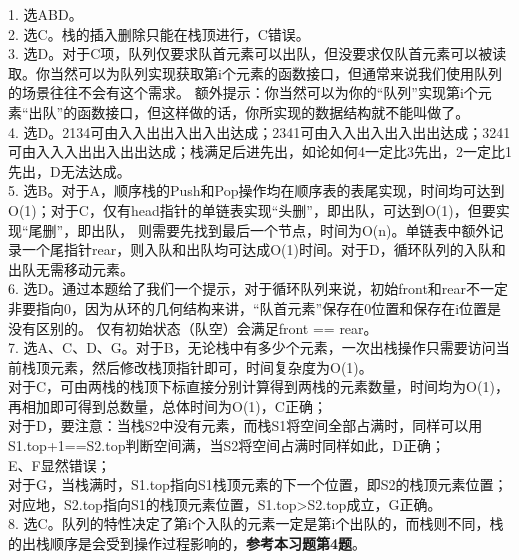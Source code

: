 \begin{exerciseanswer}
    1. 选ABD。\\

    2. 选C。栈的插入删除只能在栈顶进行，C错误。\\

    3. 选D。对于C项，队列仅要求队首元素可以出队，但没要求仅队首元素可以被读取。你当然可以为队列实现获取第i个元素的函数接口，但通常来说我们使用队列的场景往往不会有这个需求。
    额外提示：你当然可以为你的“队列”实现第i个元素“出队”的函数接口，但这样做的话，你所实现的数据结构就不能叫做了。\\

    4. 选D。2134可由入入出出入出入出达成；2341可由入入出入出入出出达成；3241可由入入入出出入出出达成；栈满足后进先出，如论如何4一定比3先出，2一定比1先出，D无法达成。\\

    5. 选B。对于A，顺序栈的Push和Pop操作均在顺序表的表尾实现，时间均可达到O(1)；对于C，仅有head指针的单链表实现“头删”，即出队，可达到O(1)，但要实现“尾删”，即出队，
    则需要先找到最后一个节点，时间为O(n)。单链表中额外记录一个尾指针rear，则入队和出队均可达成O(1)时间。对于D，循环队列的入队和出队无需移动元素。\\

    6. 选D。通过本题给了我们一个提示，对于循环队列来说，初始front和rear不一定非要指向0，因为从环的几何结构来讲，“队首元素”保存在0位置和保存在i位置是没有区别的。
    仅有初始状态（队空）会满足front == rear。\\

    7. 选A、C、D、G。对于B，无论栈中有多少个元素，一次出栈操作只需要访问当前栈顶元素，然后修改栈顶指针即可，时间复杂度为O(1)。\\
    对于C，可由两栈的栈顶下标直接分别计算得到两栈的元素数量，时间均为O(1)，再相加即可得到总数量，总体时间为O(1)，C正确；\\
    对于D，要注意：当栈S2中没有元素，而栈S1将空间全部占满时，同样可以用S1.top+1==S2.top判断空间满，当S2将空间占满时同样如此，D正确；\\
    E、F显然错误；\\
    对于G，当栈满时，S1.top指向S1栈顶元素的下一个位置，即S2的栈顶元素位置；对应地，S2.top指向S1的栈顶元素位置，S1.top>S2.top成立，G正确。\\

    8. 选C。队列的特性决定了第i个入队的元素一定是第i个出队的，而栈则不同，栈的出栈顺序是会受到操作过程影响的，{\color{red}\textbf{参考本习题第4题}}。\\


\end{exerciseanswer}
